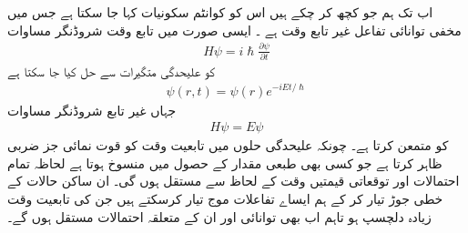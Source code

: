 
اب تک ہم جو کچھ کر چکے ہیں اس کو  کوانٹم سکونیات کہا جا سکتا ہے جس میں مخفی توانائی تفاعل غیر تابع وقت ہے ۔ ایسی صورت میں تابع وقت شروڈنگر مساوات
\begin{align*}
	H\psi=i\hslash\frac{\partial\psi}{\partial t}
\end{align*}
کو علیحدگی متگیرات سے حل کیا جا سکتا ہے 
\begin{align*}
	\psi(r, t) = \psi(r)e^{-iEt/\hslash}
\end{align*}
جہاں  غیر تابع شروڈنگر مساوات	
\begin{align*}
	H\psi=E\psi
\end{align*}
کو متمعن کرتا ہے۔ چونکہ علیحدگی حلوں میں تابعیت وقت کو قوت نمائی جز ضربی  ظاہر کرتا ہے جو کسی بھی طبعی مقدار کے حصول میں منسوخ ہوتا ہے  لحاظہ تمام احتمالات اور توقعاتی قیمتیں وقت کے لحاظ سے مستقل ہوں گی۔ ان ساکن حالات کے خطی جوڑ تیار کر کے ہم ایساے تفاعلات موج تیار کرسکتے ہیں جن کی تابعیت وقت زیادہ دلچسپ ہو تاہم اب بھی توانائی اور ان کے متعلقہ احتمالات مستقل ہوں گے۔

